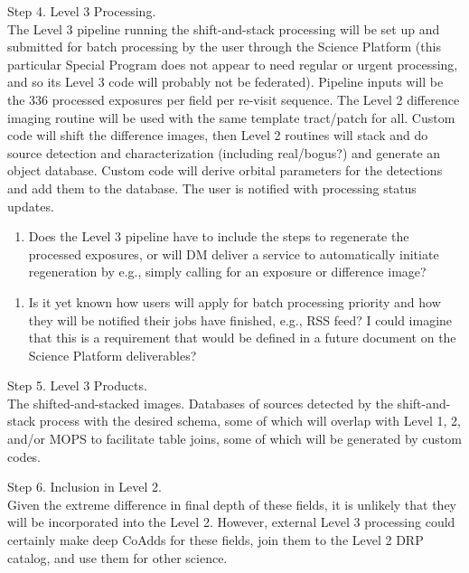 \documentclass[DM,lsstdraft,toc]{lsstdoc}
\begin{document}
Step 4. Level 3 Processing. \\ The Level 3 pipeline running the shift-and-stack processing will be set up and submitted for batch processing by the user through the Science Platform (this particular Special Program does not appear to need regular or urgent processing, and so its Level 3 code will probably not be federated). Pipeline inputs will be the 336 processed exposures per field per re-visit sequence. The Level 2 difference imaging routine will be used with the same template tract/patch for all. Custom code will shift the difference images, then Level 2 routines will stack and do source detection and characterization (including real/bogus?) and generate an object database. Custom code will derive orbital parameters for the detections and add them to the database. The user is notified with processing status updates. 
\begin{enumerate}[resume,topsep=-10pt,label= \textbf{Concern \Roman*.}] \item \label{C14} Does the Level 3 pipeline have to include the steps to regenerate the processed exposures, or will DM deliver a service to automatically initiate regeneration by e.g., simply calling for an exposure or difference image? \end{enumerate}
\begin{enumerate}[resume,topsep=-10pt,label= \textbf{Concern \Roman*.}] \item \label{C15} Is it yet known how users will apply for batch processing priority and how they will be notified their jobs have finished, e.g., RSS feed? I could imagine that this is a requirement that would be defined in a future document on the Science Platform deliverables? \end{enumerate}

Step 5. Level 3 Products. \\ The shifted-and-stacked images. Databases of sources detected by the shift-and-stack process with the desired schema, some of which will overlap with Level 1, 2, and/or MOPS to facilitate table joins, some of which will be generated by custom codes. 

Step 6. Inclusion in Level 2. \\ Given the extreme difference in final depth of these fields, it is unlikely that they will be incorporated into the Level 2. However, external Level 3 processing could certainly make deep CoAdds for these fields, join them to the Level 2 DRP catalog, and use them for other science.
\end{document}

